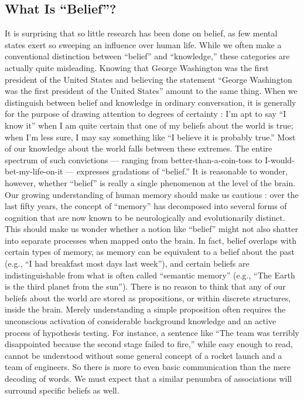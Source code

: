 \documentclass[a4paper,14pt]{extarticle}
\begin{document}
\subsection{What Is ``Belief''?}

It is surprising that so little research has been done on belief, as few mental states exert so sweeping an influence over human life.
While we often make a conventional distinction between ``belief'' and ``knowledge,'' these categories are actually quite misleading.
Knowing that George Washington was the first president of the United States and believing the statement ``George Washington was the first president of the United States'' amount to the same thing.
When we distinguish between belief and knowledge in ordinary conversation, it is generally for the purpose of drawing attention to degrees of certainty :
I’m apt to say ``I know it'' when I am quite certain that one of my beliefs about the world is true;
when I’m less sure, I may say something like ``I believe it is probably true.''
Most of our knowledge about the world falls between these extremes.
The entire spectrum of such convictions --- ranging from better-than-a-coin-toss to I-would-bet-my-life-on-it --- expresses gradations of ``belief.''
It is reasonable to wonder, however, whether ``belief'' is really a single phenomenon at the level of the brain.
Our growing understanding of human memory should make us cautious :
over the last fifty years, the concept of ``memory'' has decomposed into several forms of cognition that are now known to be neurologically and evolutionarily distinct.
This should make us wonder whether a notion like ``belief'' might not also shatter into separate processes when mapped onto the brain.
In fact, belief overlaps with certain types of memory, as memory can be equivalent to a belief about the past (e.g., ``I had breakfast most days last week''), and certain beliefs are indistinguishable from what is often called ``semantic memory'' (e.g., ``The Earth is the third planet from the sun'').
There is no reason to think that any of our beliefs about the world are stored as propositions, or within discrete structures, inside the brain.
Merely understanding a simple proposition often requires the unconscious activation of considerable background knowledge and an active process of hypothesis testing.
For instance, a sentence like ``The team was terribly disappointed because the second stage failed to fire,'' while easy enough to read, cannot be understood without some general concept of a rocket launch and a team of engineers.
So there is more to even basic communication than the mere decoding of words.
We must expect that a similar penumbra of associations will surround specific beliefs as well.
\end{document}
